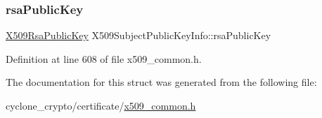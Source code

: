 \subsubsection{\texorpdfstring{rsa\+Public\+Key}{rsaPublicKey}}
{\footnotesize\ttfamily \hyperlink{structX509RsaPublicKey}{X509\+Rsa\+Public\+Key} X509\+Subject\+Public\+Key\+Info\+::rsa\+Public\+Key}



Definition at line 608 of file x509\+\_\+common.\+h.



The documentation for this struct was generated from the following file\+:\begin{DoxyCompactItemize}
\item 
cyclone\+\_\+crypto/certificate/\hyperlink{certificate_2x509__common_8h}{x509\+\_\+common.\+h}\end{DoxyCompactItemize}
